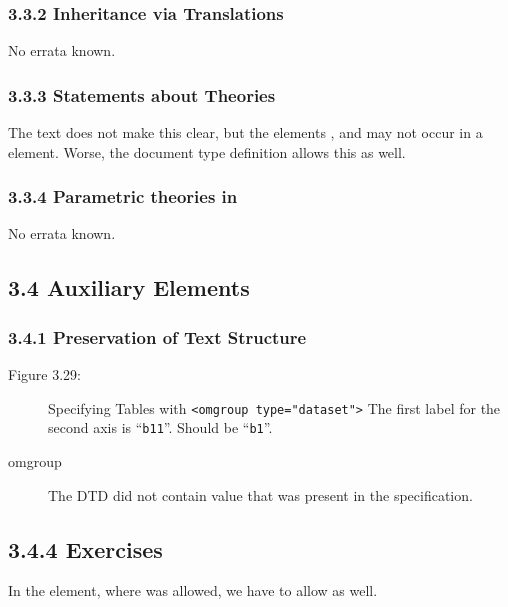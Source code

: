 \subsubsection*{3.3.2 Inheritance via Translations}
No errata known.

\subsubsection*{3.3.3 Statements about Theories}
The text does not make this clear, but the elements {},
{} and {} may not occur in a
{} element. Worse, the document type definition allows this as
well. 

\subsubsection*{3.3.4 Parametric theories in {\else{\omdoc}\fi}}
No errata known.

\subsection*{3.4 Auxiliary Elements}

\subsubsection*{3.4.1 Preservation of Text Structure}
\begin{description}
\item[Figure 3.29:] Specifying Tables with {\tt{<omgroup type="dataset">}} The first
label for the second axis is ``{\tt{b11}}''. Should be ``{\tt{b1}}''.
\item[omgroup] The DTD did not contain value {} that was present in
  the specification.
\end{description}

\subsection*{3.4.4 Exercises}
In the {} element, where {} was allowed, we have
to allow {} as well. 

